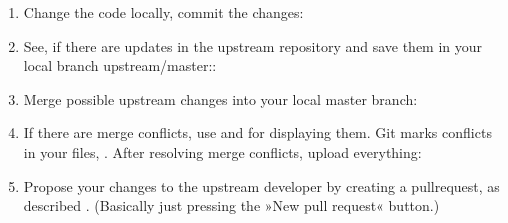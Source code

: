 \documentclass[letterpaper,10pt,english]{sphinxmanual}
\begin{document}
\begin{enumerate}
\item {} 
Change the code locally, commit the changes:

\begin{sphinxVerbatim}[commandchars=\\\{\}]
  
   
\end{sphinxVerbatim}

\item {} 
See, if there are updates in the upstream repository and save them in your local branch upstream/master::

\begin{sphinxVerbatim}[commandchars=\\\{\}]
  
\end{sphinxVerbatim}

\item {} 
Merge possible upstream changes into your local master branch:

\begin{sphinxVerbatim}[commandchars=\\\{\}]
  
\end{sphinxVerbatim}

\item {} 
If there are merge conflicts, use  and  for displaying them. Git marks conflicts in your files, . After resolving merge conflicts, upload everything:

\begin{sphinxVerbatim}[commandchars=\\\{\}]
  
   
 
\end{sphinxVerbatim}

\item {} 
Propose your changes to the upstream developer by creating a pull\sphinxhyphen{}request, as described . (Basically just pressing the »New pull request« button.)

\end{enumerate}
\end{document}
